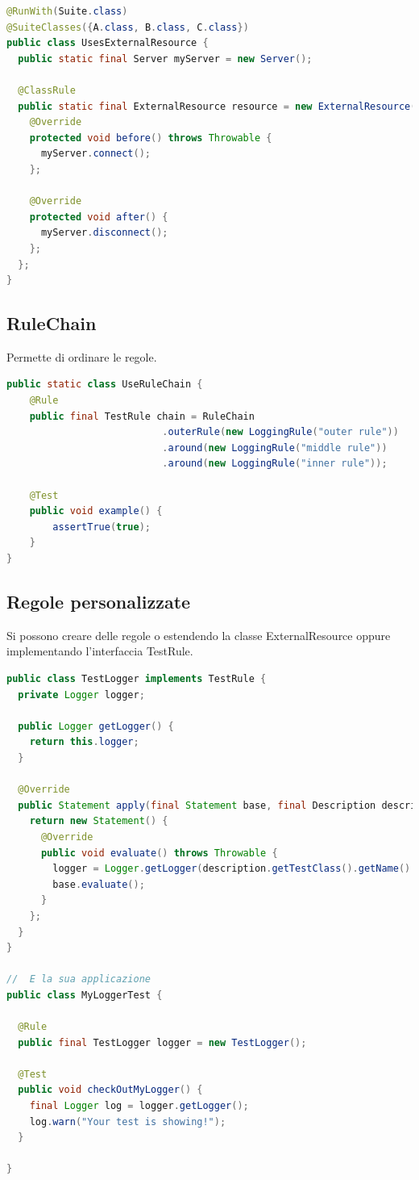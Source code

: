 \documentclass[11pt,a4paper]{book}
\begin{document}
\begin{lstlisting}[language = Java]
@RunWith(Suite.class)
@SuiteClasses({A.class, B.class, C.class})
public class UsesExternalResource {
  public static final Server myServer = new Server();

  @ClassRule
  public static final ExternalResource resource = new ExternalResource() {
    @Override
    protected void before() throws Throwable {
      myServer.connect();
    };

    @Override
    protected void after() {
      myServer.disconnect();
    };
  };
}
\end{lstlisting}

\subsection{RuleChain}
Permette di ordinare le regole.
\begin{lstlisting}[language = Java]
public static class UseRuleChain {
    @Rule
    public final TestRule chain = RuleChain
                           .outerRule(new LoggingRule("outer rule"))
                           .around(new LoggingRule("middle rule"))
                           .around(new LoggingRule("inner rule"));

    @Test
    public void example() {
        assertTrue(true);
    }
}
\end{lstlisting}

\subsection{Regole personalizzate}
Si possono creare delle regole o estendendo la classe ExternalResource oppure implementando l'interfaccia TestRule.
\begin{lstlisting}[language = Java]
public class TestLogger implements TestRule {
  private Logger logger;

  public Logger getLogger() {
    return this.logger;
  }

  @Override
  public Statement apply(final Statement base, final Description description) {
    return new Statement() {
      @Override
      public void evaluate() throws Throwable {
        logger = Logger.getLogger(description.getTestClass().getName() + '.' + description.getDisplayName());
        base.evaluate();
      }
    };
  }
}

//  E la sua applicazione
public class MyLoggerTest {

  @Rule
  public final TestLogger logger = new TestLogger();

  @Test
  public void checkOutMyLogger() {
    final Logger log = logger.getLogger();
    log.warn("Your test is showing!");
  }

}
\end{lstlisting}
\end{document}
